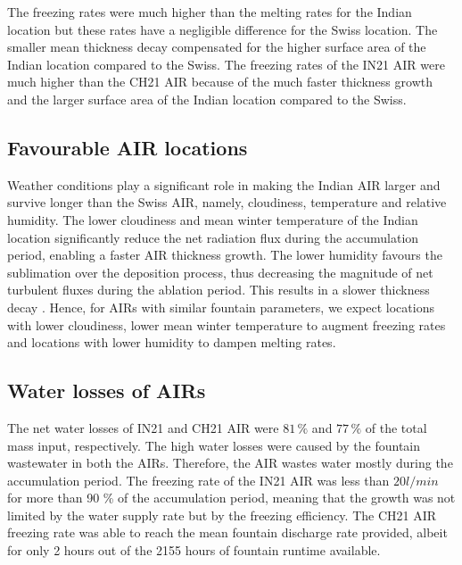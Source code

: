 \documentclass[utf8]{frontiersSCNS}
\begin{document}
The freezing rates were much higher than the melting rates for the Indian location but these rates have a
negligible difference for the Swiss location. The smaller mean thickness decay compensated for the higher
surface area of the Indian location compared to the Swiss. The freezing rates of the IN21 AIR were much higher
than the CH21 AIR because of the much faster thickness growth and the larger surface area of the Indian
location compared to the Swiss.

\subsection{Favourable AIR locations}


Weather conditions play a significant role in making the Indian AIR larger and survive longer than the
Swiss AIR, namely, cloudiness, temperature and relative humidity. The lower cloudiness and mean winter
temperature of the Indian location significantly reduce the net radiation flux during the accumulation period, enabling a faster AIR thickness growth.  The lower humidity favours the sublimation over the deposition
process, thus decreasing the magnitude of net turbulent fluxes during the ablation period. This
results in a slower thickness decay .  Hence, for AIRs with similar fountain parameters, we expect locations
with lower cloudiness, lower mean winter temperature to augment freezing rates and locations with lower humidity
to dampen melting rates.

\subsection{Water losses of AIRs}

The net water losses of IN21 and CH21 AIR were $81\,\%$ and $77\,\%$ of the total mass input, respectively. The
high water losses were caused by the fountain wastewater in both the AIRs. Therefore, the AIR wastes water
mostly during the accumulation period. The freezing rate of the IN21 AIR was less than $20 l/min$ for more than
90 \% of the accumulation period, meaning that the growth was not limited by the water supply rate but by the
freezing efficiency. The CH21 AIR freezing rate was able to reach the mean fountain discharge rate provided,
albeit for only 2 hours out of the 2155 hours of fountain runtime available. 
\end{document}
